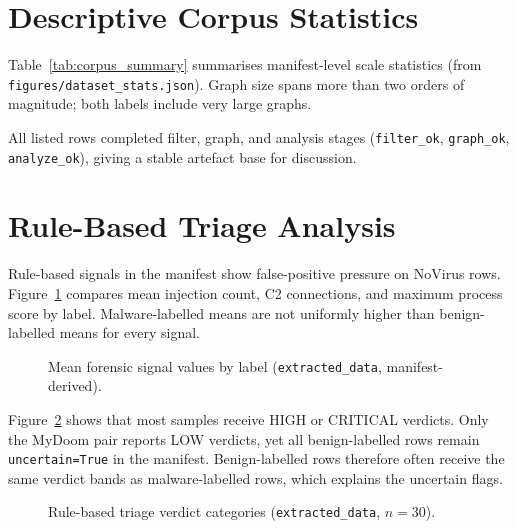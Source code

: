 \section{Descriptive Corpus Statistics}
\label{sec:descriptive_corpus}

Table~\ref{tab:corpus_summary} summarises manifest-level scale statistics (from \texttt{figures/dataset\_stats.json}). Graph size spans more than two orders of magnitude; both labels include very large graphs.

\begin{table}[htbp]
\centering
\caption{Corpus summary statistics (\texttt{extracted\_data}, 30 manifest rows).}
\label{tab:corpus_summary}

\end{table}





All listed rows completed filter, graph, and analysis stages (\texttt{filter\_ok}, \texttt{graph\_ok}, \texttt{analyze\_ok}), giving a stable artefact base for discussion.

\section{Rule-Based Triage Analysis}

Rule-based signals in the manifest show false-positive pressure on NoVirus rows. Figure~\ref{fig:forensic_signals} compares mean injection count, C2 connections, and maximum process score by label. Malware-labelled means are not uniformly higher than benign-labelled means for every signal.

\begin{figure}[htbp]
\centering

\caption{Mean forensic signal values by label (\texttt{extracted\_data}, manifest-derived).}
\label{fig:forensic_signals}
\end{figure}

Figure~\ref{fig:verdict_dist} shows that most samples receive HIGH or CRITICAL verdicts. Only the MyDoom pair reports LOW verdicts, yet all benign-labelled rows remain \texttt{uncertain=True} in the manifest. Benign-labelled rows therefore often receive the same verdict bands as malware-labelled rows, which explains the uncertain flags.

\begin{figure}[htbp]
\centering

\caption{Rule-based triage verdict categories (\texttt{extracted\_data}, $n{=}30$).}
\label{fig:verdict_dist}
\end{figure}


